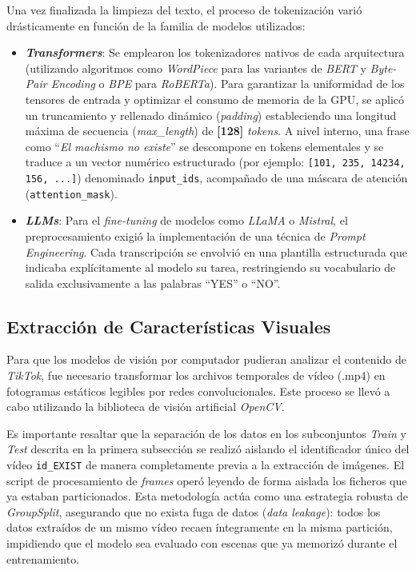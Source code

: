 Una vez finalizada la limpieza del texto, el proceso de tokenización varió drásticamente en función de la familia de modelos utilizados: 
\begin{itemize}
    \item \textbf{\textit{Transformers}}: Se emplearon los tokenizadores nativos de cada arquitectura (utilizando algoritmos como \textit{WordPiece} para las variantes de \textit{BERT} y \textit{Byte-Pair Encoding} o \textit{BPE} para \textit{RoBERTa}). Para garantizar la uniformidad de los tensores de entrada y optimizar el consumo de memoria de la GPU, se aplicó un truncamiento y rellenado dinámico (\textit{padding}) estableciendo una longitud máxima de secuencia (\textit{max\_length}) de \textbf{[128]} \textit{tokens}. A nivel interno, una frase como ``\textit{El machismo no existe}'' se descompone en tokens elementales y se traduce a un vector numérico estructurado (por ejemplo: \texttt{[101, 235, 14234, 156, ...]}) denominado \texttt{input\_ids}, acompañado de una máscara de atención (\texttt{attention\_mask}).
    \item \textbf{\textit{LLMs}}: Para el \textit{fine-tuning} de modelos como \textit{LLaMA} o \textit{Mistral}, el preprocesamiento exigió la implementación de una técnica de \textit{Prompt Engineering}. Cada transcripción se envolvió en una plantilla estructurada que indicaba explícitamente al modelo su tarea, restringiendo su vocabulario de salida exclusivamente a las palabras ``YES'' o ``NO''.
\end{itemize}

\subsection{Extracción de Características Visuales}
\label{subsec:ExtraccionDeCaracteristicasVisuales}
Para que los modelos de visión por computador pudieran analizar el contenido de \textit{TikTok}, fue necesario transformar los archivos temporales de vídeo (.mp4) en fotogramas estáticos legibles por redes convolucionales. Este proceso se llevó a cabo utilizando la biblioteca de visión artificial \textit{OpenCV}.

Es importante resaltar que la separación de los datos en los subconjuntos \textit{Train} y \textit{Test} descrita en la primera subsección se realizó aislando el identificador único del vídeo \texttt{id\_EXIST} de manera completamente previa a la extracción de imágenes. El script de procesamiento de \textit{frames} operó leyendo de forma aislada los ficheros que ya estaban particionados. Esta metodología actúa como una estrategia robusta de \textit{GroupSplit}, asegurando que no exista fuga de datos (\textit{data leakage}): todos los datos extraídos de un mismo vídeo recaen íntegramente en la misma partición, impidiendo que el modelo sea evaluado con escenas que ya memorizó durante el entrenamiento. 

